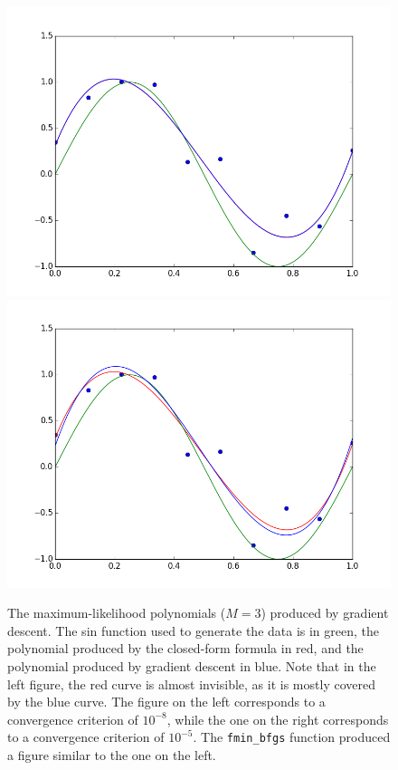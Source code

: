 \documentclass{article}
\begin{document}
\begin{figure}
\includegraphics[scale=0.4]{figure2_1.png}
\includegraphics[scale=0.4]{figure2_2.png}
\caption{The maximum-likelihood polynomials ($M=3$) produced by gradient descent. The sin function used to generate the data is in green, the polynomial produced by the closed-form formula in red, and the polynomial produced by gradient descent in blue. Note that in the left figure, the red curve is almost invisible, as it is mostly covered by the blue curve. The figure on the left corresponds to a convergence criterion of $10^{-8}$, while the one on the right corresponds to a convergence criterion of $10^{-5}$. The \texttt{fmin\_bfgs} function produced a figure similar to the one on the left.}
\end{figure}
\end{document}
